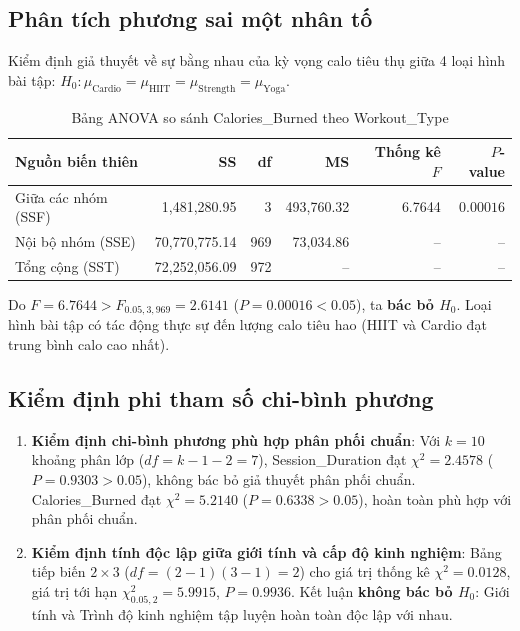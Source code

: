 \documentclass[12pt,a4paper]{report}
\begin{document}
\subsection{Phân tích phương sai một nhân tố}
Kiểm định giả thuyết về sự bằng nhau của kỳ vọng calo tiêu thụ giữa 4 loại hình bài tập: $H_0: \mu_{\text{Cardio}} = \mu_{\text{HIIT}} = \mu_{\text{Strength}} = \mu_{\text{Yoga}}$.
\begin{table}[htbp]
\centering\small
\caption{Bảng ANOVA so sánh Calories\_Burned theo Workout\_Type}
\begin{tabular}{lrrrrr}
\toprule
\textbf{Nguồn biến thiên} & \textbf{SS} & \textbf{df} & \textbf{MS} & \textbf{Thống kê $F$} & \textbf{$P$-value} \\
\midrule
Giữa các nhóm (SSF) & 1,481,280.95 & 3 & 493,760.32 & 6.7644 & $0.00016$ \\
Nội bộ nhóm (SSE) & 70,770,775.14 & 969 & 73,034.86 & -- & -- \\
Tổng cộng (SST) & 72,252,056.09 & 972 & -- & -- & -- \\
\bottomrule
\end{tabular}
\end{table}
Do $F = 6.7644 > F_{0.05, 3, 969} = 2.6141$ ($P = 0.00016 < 0.05$), ta \textbf{bác bỏ $H_0$}. Loại hình bài tập có tác động thực sự đến lượng calo tiêu hao (HIIT và Cardio đạt trung bình calo cao nhất).

\subsection{Kiểm định phi tham số chi-bình phương}
\begin{enumerate}
    \item \textbf{Kiểm định chi-bình phương phù hợp phân phối chuẩn}:
    Với $k = 10$ khoảng phân lớp ($df = k - 1 - 2 = 7$), Session\_Duration đạt $\chi^2 = 2.4578$ ($P = 0.9303 > 0.05$), không bác bỏ giả thuyết phân phối chuẩn. Calories\_Burned đạt $\chi^2 = 5.2140$ ($P = 0.6338 > 0.05$), hoàn toàn phù hợp với phân phối chuẩn.
    \item \textbf{Kiểm định tính độc lập giữa giới tính và cấp độ kinh nghiệm}:
    Bảng tiếp biến $2 \times 3$ ($df = (2-1)(3-1) = 2$) cho giá trị thống kê $\chi^2 = 0.0128$, giá trị tới hạn $\chi^2_{0.05, 2} = 5.9915$, $P = 0.9936$. Kết luận \textbf{không bác bỏ $H_0$}: Giới tính và Trình độ kinh nghiệm tập luyện hoàn toàn độc lập với nhau.
\end{enumerate}

\end{document}
